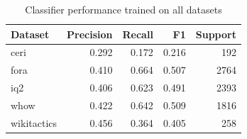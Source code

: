 \begin{table}[t]
\caption{Classifier performance trained on all datasets}
\label{tab:metrics_all}
\begin{tabular}{lrrrr}
\toprule
Dataset & Precision & Recall & F1 & Support \\
\midrule
ceri & 0.292 & 0.172 & 0.216 & 192 \\
fora & 0.410 & 0.664 & 0.507 & 2764 \\
iq2 & 0.406 & 0.623 & 0.491 & 2393 \\
whow & 0.422 & 0.642 & 0.509 & 1816 \\
wikitactics & 0.456 & 0.364 & 0.405 & 258 \\
\bottomrule
\end{tabular}
\end{table}
